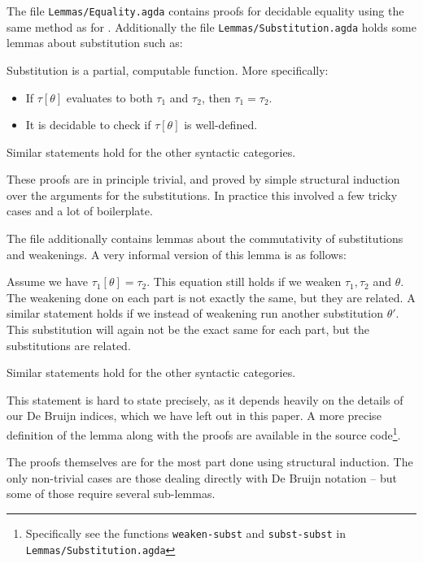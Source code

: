 The file \texttt{Lemmas/Equality.agda} contains proofs for decidable equality
using the same method as for \ATALe. Additionally the file
\texttt{Lemmas/Substitution.agda} holds some lemmas about substitution such as:

\begin{lemma}
  \label{lemma:computsubst}
  Substitution is a partial, computable function. More specifically:
  \begin{itemize}
  \item If $\tau[\theta]$ evaluates to both $\tau_1$ and $\tau_2$, then
    $\tau_1 = \tau_2$.
  \item It is decidable to check if $\tau[\theta]$ is well-defined.
  \end{itemize}

  Similar statements hold for the other syntactic categories.
\end{lemma}

These proofs are in principle trivial, and proved by simple structural induction
over the arguments for the substitutions. In practice this involved a few tricky
cases and a lot of boilerplate.

The file additionally contains lemmas about the commutativity of substitutions
and weakenings. A very informal version of this lemma is as follows:

\begin{lemma}
  Assume we have $\tau_1[\theta] = \tau_2$. This equation still holds if we
  weaken $\tau_1, \tau_2$ and $\theta$. The weakening done on each part is not
  exactly the same, but they are related. A similar statement holds if we
  instead of weakening run another substitution $\theta'$. This substitution
  will again not be the exact same for each part, but the substitutions are
  related.

  Similar statements hold for the other syntactic categories.
\end{lemma}

This statement is hard to state precisely, as it depends heavily on the details
of our De Bruijn indices, which we have left out in this paper. A more precise
definition of the lemma along with the proofs are available in the source
code\footnote{Specifically see the functions \texttt{weaken-subst} and
  \texttt{subst-subst} in \texttt{Lemmas/Substitution.agda}}.

The proofs themselves are for the most part done using structural induction. The
only non-trivial cases are those dealing directly with De Bruijn notation -- but
some of those require several sub-lemmas.

